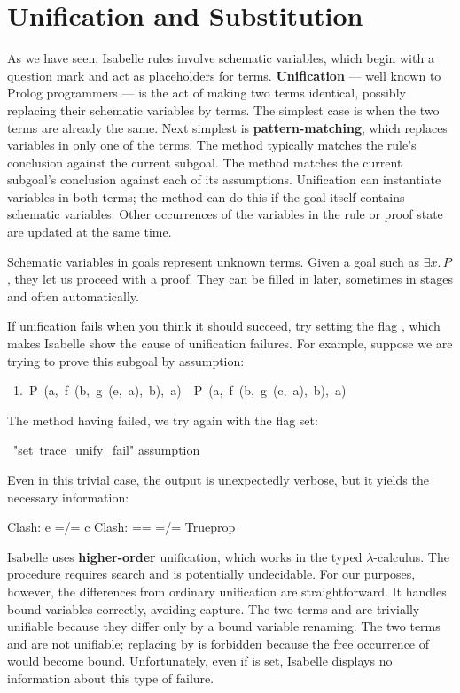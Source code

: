 \section{Unification and Substitution}\label{sec:unification}

%
As we have seen, Isabelle rules involve schematic variables, which begin with
a question mark and act as
placeholders for terms.  \textbf{Unification} --- well known to Prolog programmers --- is the act of
making two terms identical, possibly replacing their schematic variables by
terms.  The simplest case is when the two terms are already the same. Next
simplest is \textbf{pattern-matching}, which replaces variables in only one of the
terms.  The
 method typically  matches the rule's conclusion
against the current subgoal.  The
 method matches the current subgoal's conclusion
against each of its assumptions.   Unification can instantiate variables in both terms; the  method can do this if the goal
itself contains schematic variables.  Other occurrences of the variables in
the rule or proof state are updated at the same time.

Schematic variables in goals represent unknown terms.  Given a goal such
as $\exists x.\,P$, they let us proceed with a proof.  They can be 
filled in later, sometimes in stages and often automatically. 

If unification fails when you think it should succeed, try setting the flag ,
which makes Isabelle show the cause of unification failures.  For example, suppose we are trying to prove this subgoal by assumption:
\begin{isabelle}
\ 1.\ P\ (a,\ f\ (b,\ g\ (e,\ a),\ b),\ a)\ \isasymLongrightarrow \ P\ (a,\ f\ (b,\ g\ (c,\ a),\ b),\ a)
\end{isabelle}
The  method having failed, we try again with the flag set:
\begin{isabelle}
\ "set\ trace\_unify\_fail"\isanewline
{} assumption
\end{isabelle}
Even in this trivial case, the output is unexpectedly verbose, but it yields the necessary information:
\begin{isabelle}
Clash: e =/= c\isanewline
Clash: == =/= Trueprop
\end{isabelle}

Isabelle uses
\textbf{higher-order} unification, which works in the
typed $\lambda$-calculus.  The procedure requires search and is potentially
undecidable.  For our purposes, however, the differences from ordinary
unification are straightforward.  It handles bound variables
correctly, avoiding capture.  The two terms
 and  are
trivially unifiable because they differ only by a bound variable renaming.  The two terms  and
  are not unifiable; replacing  by
 is forbidden because the free occurrence of~ would become
bound.  Unfortunately, even if  is set, Isabelle displays no information about this type of failure.

